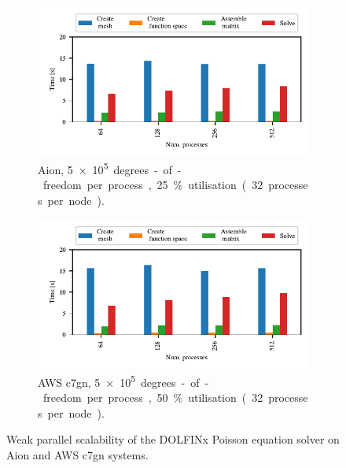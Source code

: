 \begin{figure}
    \begin{subfigure}{.7\textwidth}
	\begin{center}
        \includegraphics{chapters/chp1/graphics/parallel_scaling_plots/output/weak_scaling_aion_poisson.pdf}
        \caption{Aion, \SI{5e+5} degrees-of-freedom per process, 25 \% utilisation (32 processes per node).}
        \label{fig:weak-scaling-aion}
	\end{center}
    \end{subfigure}

    \begin{subfigure}{.7\textwidth}
	\begin{center}
        \includegraphics{chapters/chp1/graphics/parallel_scaling_plots/output/weak_scaling_aws_c7gn_poisson.pdf}
        \caption{AWS c7gn, \SI{5e+5} degrees-of-freedom per process, 50 \% utilisation (32 processes per node).}
        \label{fig:weak-scaling-aws}
	\end{center}
    \end{subfigure}
    \caption{Weak parallel scalability of the DOLFINx Poisson equation solver on Aion and AWS c7gn systems.}
    \label{fig:weak-scaling}
\end{figure}

